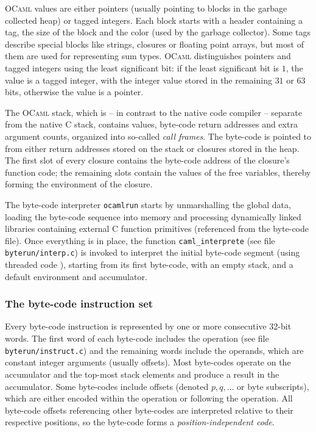\documentclass[a4paper]{acm_proc_article-sp}
\begin{document}
\textsc{OCaml} values are either pointers (usually pointing to blocks in the garbage collected
heap) or tagged integers. Each block starts with a header containing a tag, the size of the block
and the color (used by the garbage collector). Some tags describe special blocks like strings,
closures or floating point arrays, but most of them are used for representing sum types.
\textsc{OCaml} distinguishes pointers and tagged integers using the least significant bit: if
the least significant bit is $1$, the value is a tagged integer, with the integer value stored
in the remaining $31$ or $63$ bits, otherwise the value is a pointer.

The \textsc{OCaml} stack, which is -- in contrast to the native code compiler -- separate from
the native C stack, contains values, byte-code return addresses and extra argument counts,
organized into so-called \emph{call frames}. The byte-code is pointed to from either return
addresses stored on the stack or closures stored in the heap. The first slot of every closure
contains the byte-code address of the closure's function code; the remaining slots contain
the values of the free variables, thereby forming the environment of the closure.

The byte-code interpreter \texttt{ocamlrun} starts by unmarshalling the global data, loading
the byte-code sequence into memory and processing dynamically linked libraries containing
external C function primitives (referenced from the byte-code file). Once everything is in
place, the function \linebreak[4]\texttt{caml\_interprete} (see file \texttt{byterun/interp.c}) is invoked
to interpret the initial byte-code segment (using threaded code \cite{Bell73,ErtlGregg03}),
starting from its first byte-code, with an empty stack, and a default environment and accumulator.

\subsubsection{The byte-code instruction set}

Every byte-code instruction is represented by one or more consecutive 32-bit words. The
first word of each byte-code includes the operation (see file \texttt{byterun/instruct.c})
and the remaining words include the operands, which are constant integer arguments (usually
offsets). Most byte-codes operate on the accumulator and the top-most stack elements and
produce a result in the accumulator. Some byte-codes include offsets (denoted $p,q,\ldots$
or byte subscripts), which are either encoded within the operation or following the
operation. All byte-code offsets referencing other byte-codes are interpreted relative to their
respective positions, so the byte-code forms a \emph{position-independent code}.
\end{document}
